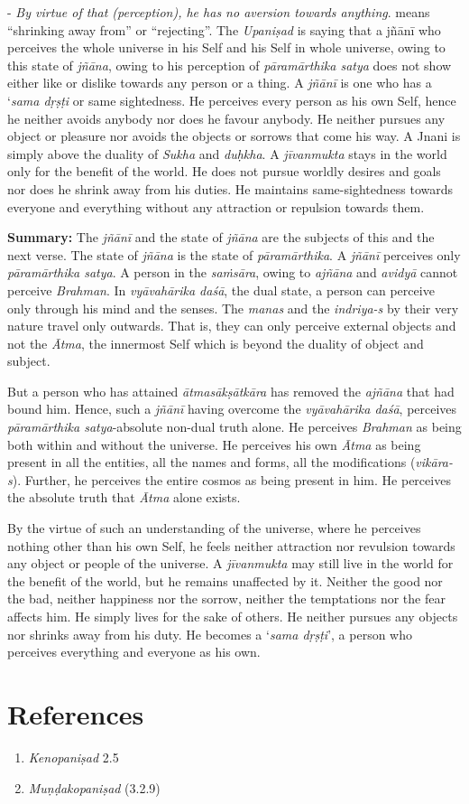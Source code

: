 - \emph{By virtue of that (perception), he has no aversion towards anything}.  means ``shrinking away from'' or ``rejecting''. The \emph{Upaniṣad} is saying that a jñānī who perceives the whole universe in his Self and his Self in whole universe, owing to this state of \emph{jñāna}, owing to his perception of \emph{pāramārthika satya} does not show either like or dislike towards any person or a thing. A \emph{jñānī} is one who has a `\emph{sama dṛṣṭi} or same sightedness. He perceives every person as his own Self, hence he neither avoids anybody nor does he favour anybody. He neither pursues any object or pleasure nor avoids the objects or sorrows that come his way. A Jnani is simply above the duality of \emph{Sukha} and \emph{duḥkha}. A \emph{jīvanmukta} stays in the world only for the benefit of the world. He does not pursue worldly desires and goals nor does he shrink away from his duties. He maintains same-sightedness towards everyone and everything without any attraction or repulsion towards them.

\textbf{Summary:} The \emph{jñānī} and the state of \emph{jñāna} are the subjects of this and the next verse. The state of \emph{jñāna} is the state of \emph{pāramārthika}. A \emph{jñānī} perceives only \emph{pāramārthika satya}. A person in the \emph{saṁsāra}, owing to \emph{ajñāna} and \emph{avidyā} cannot perceive \emph{Brahman}. In \emph{vyāvahārika daśā}, the dual state, a person can perceive only through his mind and the senses. The \emph{manas} and the \emph{indriya-s} by their very nature travel only outwards. That is, they can only perceive external objects and not the \emph{Ātma}, the innermost Self which is beyond the duality of object and subject.

But a person who has attained \emph{ātmasākṣātkāra} has removed the \emph{ajñāna} that had bound him. Hence, such a \emph{jñānī} having overcome the \emph{vyāvahārika daśā}, perceives \emph{pāramārthika satya}-absolute non-dual truth alone. He perceives \emph{Brahman} as being both within and without the universe. He perceives his own \emph{Ātma} as being present in all the entities, all the names and forms, all the modifications (\emph{vikāra-s}). Further, he perceives the entire cosmos as being present in him. He perceives the absolute truth that \emph{Ātma} alone exists.

By the virtue of such an understanding of the universe, where he perceives nothing other than his own Self, he feels neither attraction nor revulsion towards any object or people of the universe. A \emph{jīvanmukta} may still live in the world for the benefit of the world, but he remains unaffected by it. Neither the good nor the bad, neither happiness nor the sorrow, neither the temptations nor the fear affects him. He simply lives for the sake of others. He neither pursues any objects nor shrinks away from his duty. He becomes a `\emph{sama dṛṣṭi}', a person who perceives everything and everyone as his own.

\section*{References}

\begin{enumerate}
\itemsep=0pt
\item
  \emph{Kenopaniṣad} 2.5
\item
  \emph{Muṇḍakopaniṣad} (3.2.9)
\end{enumerate}

